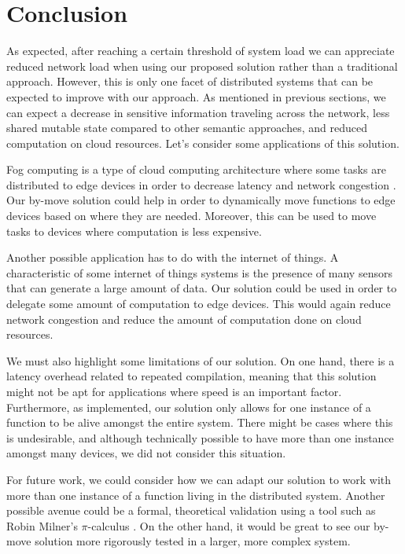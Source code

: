
\chapter{Conclusion}
\label{cha:Conclusion}

As expected, after reaching a certain threshold of system load we can appreciate reduced network load when using our proposed solution rather than a traditional approach. However, this is only one facet of distributed systems that can be expected to improve with our approach. As mentioned in previous sections, we can expect a decrease in sensitive information traveling across the network, less shared mutable state compared to other semantic approaches, and reduced computation on cloud resources. Let's consider some applications of this solution.

Fog computing is a type of cloud computing architecture where some tasks are distributed to edge devices in order to decrease latency and network congestion \cite{alma991005271676907681}. Our by-move solution could help in order to dynamically move functions to edge devices based on where they are needed. Moreover, this can be used to move tasks to devices where computation is less expensive.

Another possible application has to do with the internet of things. A characteristic of some internet of things systems is the presence of many sensors that can generate a large amount of data\cite{alma991005271676907681}. Our solution could be used in order to delegate some amount of computation to edge devices. This would again reduce network congestion and reduce the amount of computation done on cloud resources.

We must also highlight some limitations of our solution. On one hand, there is a latency overhead related to repeated compilation, meaning that this solution might not be apt for applications where speed is an important factor. Furthermore, as implemented, our solution only allows for one instance of a function to be alive amongst the entire system. There might be cases where this is undesirable, and although technically possible to have more than one instance amongst many devices, we did not consider this situation.

For future work, we could consider how we can adapt our solution to work with more than one instance of a function living in the distributed system. Another possible avenue could be a formal, theoretical validation using a tool such as Robin Milner's $\pi$-calculus \cite{MILNER19921}. On the other hand, it would be great to see our by-move solution more rigorously tested in a larger, more complex system.